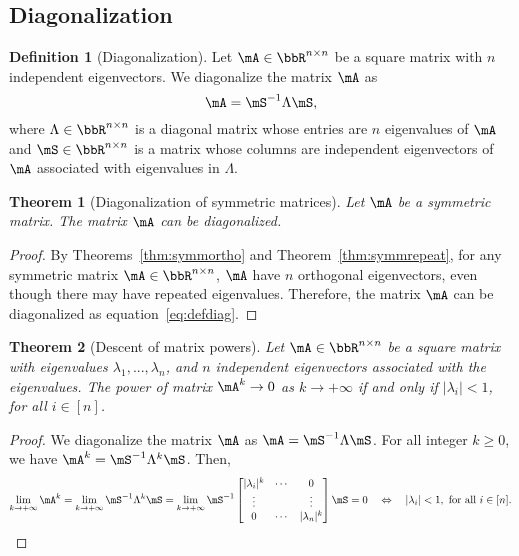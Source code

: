 \documentclass[11pt]{article}
\theoremstyle{plain}
\newtheorem{thm}{Theorem}[section]
\theoremstyle{definition}
\newtheorem{defn}{Definition}
\begin{document}
\subsection{Diagonalization}

\begin{defn}[Diagonalization]
	Let  $\mA \in \bbR^{n \times n}$ be a square matrix with $n$ independent eigenvectors. We diagonalize the matrix $\mA$ as
	\begin{equation}\label{eq:defdiag}
		\mA = \mS^{-1} \Lambda \mS,
	\end{equation}
	where $\Lambda \in \bbR^{n \times n}$ is a diagonal matrix whose entries are $n$ eigenvalues of $\mA$ and  $\mS \in \bbR^{n \times n}$ is a matrix whose columns are independent eigenvectors of $\mA$ associated with eigenvalues in $\Lambda$.
\end{defn}

\begin{thm}[Diagonalization of symmetric matrices]
Let $\mA$ be a symmetric matrix. The matrix $\mA$ can be diagonalized.
\end{thm}

\begin{proof}
	By Theorems~\ref{thm:symmortho} and Theorem~\ref{thm:symmrepeat}, for any symmetric matrix $\mA \in \bbR^{n \times n}$, $\mA$ have $n$ orthogonal eigenvectors, even though there may have repeated eigenvalues. Therefore, the matrix $\mA$ can be diagonalized as equation~\eqref{eq:defdiag}.
\end{proof}

\begin{thm}[Descent of matrix powers]
	Let $\mA \in \bbR^{n \times n}$ be  a square matrix with eigenvalues $\lambda_1,...,\lambda_n$, and  $n$ independent eigenvectors associated with the eigenvalues. The power of matrix $\mA^k \rightarrow 0$ as $k \rightarrow +\infty$ if and only if $|\lambda_i| < 1$, for all $i \in [n]$.
\end{thm}

\begin{proof}
	We diagonalize the matrix $\mA$ as $\mA =\mS^{-1} \Lambda \mS$. For all integer $k\geq 0$, we have $\mA^k = \mS^{-1} \Lambda^{k} \mS$. Then,
	\[ \lim_{k \rightarrow +\infty} \mA^k = \lim_{k \rightarrow +\infty} \mS^{-1} \Lambda^{k} \mS  =  \lim_{k \rightarrow +\infty} \mS^{-1} \begin{bmatrix}
		|\lambda_i|^k & \cdots &0\\
		\vdots & &\vdots\\
		0 & \cdots & |\lambda_n|^k
	\end{bmatrix} \mS  = 0 \quad \Leftrightarrow \quad  |\lambda_i| < 1, \text{ for all } i \in [n]. \]
\end{proof}
\end{document}
